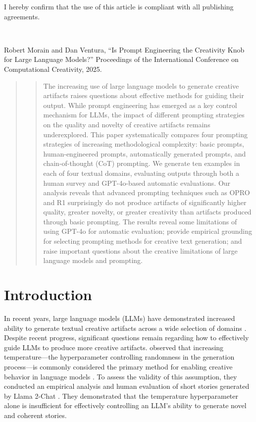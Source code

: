 \documentclass[phd,electronic,oneside,twosidetoc,letterpaper,chaptercenter,parttop,lof]{byumsphd}
\begin{document}
I hereby confirm that the use of this article is compliant with all publishing agreements.

\

\noindent
Robert Morain and Dan Ventura, ``Is Prompt Engineering the Creativity Knob for Large Language Models?'' Proceedings of the International Conference on Computational Creativity, 2025.

\begin{abstract}
\begin{quote}
The increasing use of large language models to generate creative artifacts raises questions about effective methods for guiding their output. While prompt engineering has emerged as a key control mechanism for LLMs, the impact of different prompting strategies on the quality and novelty of creative artifacts remains underexplored. This paper systematically compares four prompting strategies of increasing methodological complexity: basic prompts, human-engineered prompts, automatically generated prompts, and chain-of-thought (CoT) prompting. We generate ten examples in each of four textual domains, evaluating outputs through both a human survey and GPT-4o-based automatic evaluations. Our analysis reveals that advanced prompting techniques such as OPRO and R1 surprisingly do not produce artifacts of significantly higher quality, greater novelty, or greater creativity than artifacts produced through basic prompting. The results reveal some limitations of using GPT-4o for automatic evaluation; provide empirical grounding for selecting prompting methods for creative text generation; and raise important questions about the creative limitations of large language models and prompting.  

\end{quote}
\end{abstract}

\section{Introduction}

In recent years, large language models (LLMs) have demonstrated increased ability to generate textual creative artifacts across a wide selection of domains \cite{morain2023language,calderwood2020novelists,sawicki2023power,toplyn2021witscript}. Despite recent progress, significant questions remain regarding how to effectively guide LLMs to produce more creative artifacts. \citeauthor{peeperkorn2024temperature} observed that increasing temperature---the hyperparameter controlling randomness in the generation process---is commonly considered the primary method for enabling creative behavior in language models \cite{peeperkorn2024temperature}. To assess the validity of this assumption, they conducted an empirical analysis and human evaluation of short stories generated by Llama 2-Chat \cite{touvron2023llama2openfoundation}. They demonstrated that the temperature hyperparameter alone is insufficient for effectively controlling an LLM's ability to generate novel and coherent stories.
\end{document}
